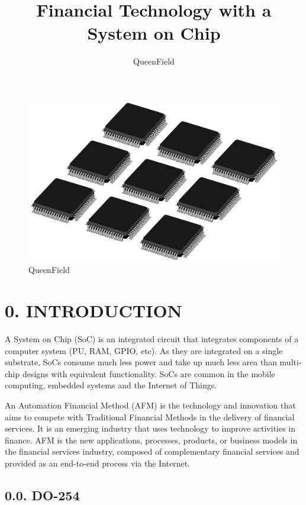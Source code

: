\documentclass[
]{article}
\title{Financial Technology with a System on Chip}
\author{QueenField}
\date{}
\begin{document}
\maketitle

\begin{figure}
\centering
\includegraphics{../icon.jpg}
\caption{QueenField}
\end{figure}

\hypertarget{introduction}{%
\section{0. INTRODUCTION}\label{introduction}}

A System on Chip (SoC) is an integrated circuit that integrates
components of a computer system (PU, RAM, GPIO, etc). As they are
integrated on a single substrate, SoCs consume much less power and take
up much less area than multi-chip designs with equivalent functionality.
SoCs are common in the mobile computing, embedded systems and the
Internet of Things.

An Automation Financial Method (AFM) is the technology and innovation
that aims to compete with Traditional Financial Methods in the delivery
of financial services. It is an emerging industry that uses technology
to improve activities in finance. AFM is the new applications,
processes, products, or business models in the financial services
industry, composed of complementary financial services and provided as
an end-to-end process via the Internet.

\hypertarget{do-254}{%
\subsection{0.0. DO-254}\label{do-254}}
\end{document}

